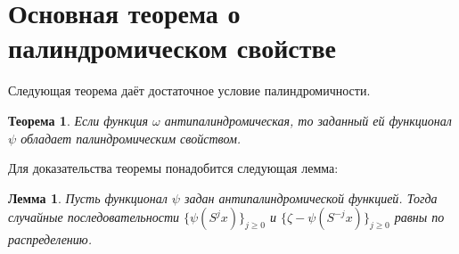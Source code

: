 \documentclass[14pt, a4paper, russian]{report}
\newtheorem{lemma}{\indent Лемма}
\newtheorem{theorem}{\indent Теорема}
\begin{document}
\section{Основная теорема о палиндромическом свойстве}
Следующая теорема даёт достаточное условие палиндромичности.

\begin{theorem}\label{palindromic_theorem}
Если функция $\omega$ антипалиндромическая, то заданный ей функционал $\psi$ обладает палиндромическим свойством.
\end{theorem}

Для доказательства теоремы понадобится следующая лемма:

\begin{lemma}\label{antipalindromic_lemma}
Пусть функционал $\psi$ задан антипалиндромической функцией. Тогда случайные последовательности $\{\psi(S^j x)\}_{j \ge 0}$ и $\{ \zeta - \psi(S^{-j} x)\}_{j \ge 0}$ равны по распределению. 
\end{lemma}
\end{document}

